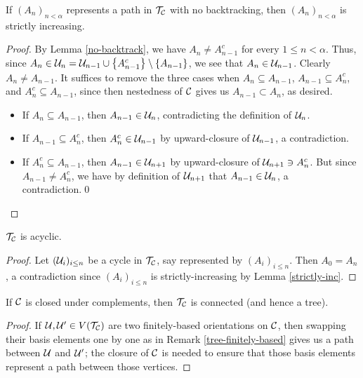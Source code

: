 \documentclass{amsart}
\begin{document}
    \begin{lemma}\label{strictly-inc}
        If $(A_n)_{n<\alpha}$ represents a path in $\mathcal{T}_{\mathcal{C}}$ with no backtracking, then $(A_n)_{n<\alpha}$ is strictly increasing.
    \end{lemma}
    \begin{proof}
        By Lemma \ref{no-backtrack}, we have $A_n\neq A_{n-1}^c$ for every $1\leq n<\alpha$. Thus, since $A_n\in\mathcal{U}_n=\mathcal{U}_{n-1}\cup\left\{A_{n-1}^c\right\}\setminus\left\{A_{n-1}\right\}$, we see that $A_n\in\mathcal{U}_{n-1}$. Clearly $A_n\neq A_{n-1}$. It suffices to remove the three cases when $A_n\subseteq A_{n-1}$, $A_{n-1}\subseteq A_n^c$, and $A_n^c\subseteq A_{n-1}$, since then nestedness of $\mathcal{C}$ gives us $A_{n-1}\subset A_n$, as desired.
        \begin{itemize}
            \item If $A_n\subseteq A_{n-1}$, then $A_{n-1}\in\mathcal{U}_n$, contradicting the definition of $\mathcal{U}_n$.
            \item If $A_{n-1}\subseteq A_n^c$, then $A_n^c\in\mathcal{U}_{n-1}$ by upward-closure of $\mathcal{U}_{n-1}$, a contradiction.
            \item If $A_n^c\subseteq A_{n-1}$, then $A_{n-1}\in\mathcal{U}_{n+1}$ by upward-closure of $\mathcal{U}_{n+1}\ni A_n^c$. But since $A_{n-1}\neq A_n^c$, we have by definition of $\mathcal{U}_{n+1}$ that $A_{n-1}\in\mathcal{U}_n$, a contradiction.\qed
        \end{itemize}
    \end{proof}

    \begin{proposition}\label{acyclic}
        $\mathcal{T}_{\mathcal{C}}$ is acyclic.
    \end{proposition}
    \begin{proof}
        Let $(\mathcal{U}_i)_{i\leq n}$ be a cycle in $\mathcal{T}_{\mathcal{C}}$, say represented by $(A_i)_{i\leq n}$. Then $A_0=A_n$, a contradiction since $(A_i)_{i\leq n}$ is strictly-increasing by Lemma \ref{strictly-inc}.
    \end{proof}

    \begin{proposition}\label{tree}
        If $\mathcal{C}$ is closed under complements, then $\mathcal{T}_{\mathcal{C}}$ is connected (and hence a tree).
    \end{proposition}
    \begin{proof}
        If $\mathcal{U},\mathcal{U}'\in V(\mathcal{T}_{\mathcal{C}})$ are two finitely-based orientations on $\mathcal{C}$, then swapping their basis elements one by one as in Remark \ref{tree-finitely-based} gives us a path between $\mathcal{U}$ and $\mathcal{U}'$; the closure of $\mathcal{C}$ is needed to ensure that those basis elements represent a path between those vertices.
    \end{proof}
\end{document}
